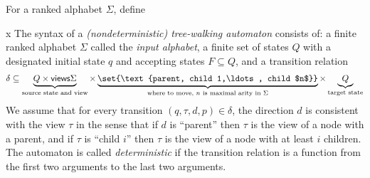 \newcommand{\views}{\mathsf{views}}
For a ranked alphabet $\Sigma$, define 


\begin{definition}x
The syntax of a  \emph{(nondeterministic) tree-walking automaton} consists of: a finite ranked alphabet $\Sigma$ called the \emph{input alphabet}, a finite set of states $Q$ with a designated initial state $q$ and  accepting states $F \subseteq Q$, and a transition relation
		\begin{align*}
	\delta \subseteq \underbrace{Q \times \views \Sigma}_{\text{source state and view}} \times \underbrace{\set{\text{parent, child 1,\ldots, child $n$}}}_{\text{where to move, $n$ is maximal arity in $\Sigma$}} \times \underbrace{Q}_{\text{target state}}
		\end{align*}
		We assume that for every transition $(q,\tau,d,p) \in \delta$,  the direction $d$ is consistent with the view $\tau$ in the sense that if $d$ is ``parent'' then $\tau$ is the view of a node with a parent, and if $\tau$ is ``child $i$'' then $\tau$ is the view of a node with at least $i$ children.
The automaton is called \emph{deterministic} if the  transition relation is  a function from the first two arguments to the last two arguments.
\end{definition}

